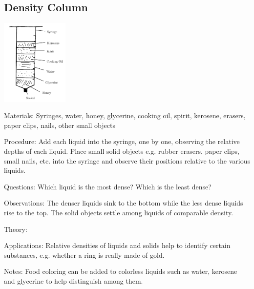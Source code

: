\begin{multicols}{2}

\subsection{Density Column}
\label{sub:density-column}

\begin{center}
\includegraphics[width=0.25\textwidth]{./img/density-tower.png}
\end{center}

\begin{description*}
\item[Materials:]{Syringes, water, honey, glycerine, cooking oil, spirit, kerosene, erasers, paper clips, nails, other small objects}
\item[Procedure:]{Add each liquid into the syringe, one by one, observing the relative depths of each liquid. Place small solid objects e.g. rubber erasers, paper clips, small nails, etc. into the syringe and observe their positions relative to the various liquids.}
\item[Questions:]{Which liquid is the most dense? Which is the least dense?}
\item[Observations:]{The denser liquids sink to the bottom while the less dense liquids rise to the top. The solid objects settle among liquids of comparable density.}
\item[Theory:]{}
\item[Applications:]{Relative densities of liquids and solids help to identify certain substances, e.g. whether a ring is really made of gold.}
\item[Notes:]{Food coloring can be added to colorless liquids such as water, kerosene and glycerine to help distinguish among them.}
\end{description*}


\end{multicols}
